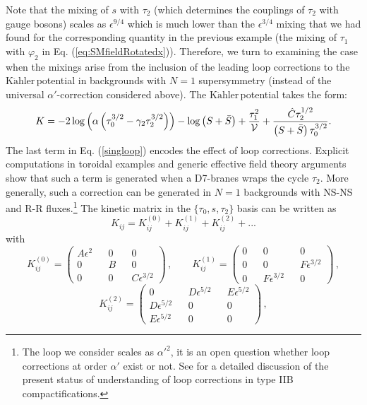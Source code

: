 \documentclass[11pt,a4paper]{article}
\newcommand{\V}{\mathcal{V}}
\newcommand{\Kahler}{\ensuremath{\text{K}\ddot{\text{a}}\text{hler}\,}}
\def\pref#1{(\ref{#1})}
\begin{document}
Note that the mixing of $s$ with $\tau_2$ (which determines the couplings of $\tau_2$ with gauge bosons) scales as $\epsilon^{9/4}$ which is much lower than the $\epsilon^{3/4}$ mixing that we had found for the corresponding quantity in the previous example (the mixing of $\tau_1$ with $\varphi_2$ in Eq. \pref{eq:SMfieldRotatedx}). Therefore, we turn to examining the case when the mixings arise from the inclusion of the leading loop corrections to the \Kahler potential in backgrounds with $N=1$ supersymmetry (instead of the universal $\alpha'$-correction considered above). The \Kahler potential takes the form:
%
%
\begin{equation}
\label{singloop}
K = - 2 \log\left(\alpha \left(\tau_0^{3/2} - \gamma_2 \tau_2^{3/2}\right)\right)   - \log \left( S + \bar{S}\right)+ \frac{\tau_1^2}{\V} + { {\hat{C}  \tau^{1/2}_{2}}\over {\left(S + \bar{S}\right) \tau_{0}^{3/2}} }.
\end{equation}
%
The last term in Eq. \pref{singloop} encodes the effect of loop corrections. Explicit computations in toroidal examples  and generic  effective field theory arguments \cite{Berg:2005ja, Conlon:2006gv, Berg:2007wt, Cicoli:2007xp, Cicoli:2008va} show that such a term is generated when a D7-branes wraps the cycle $\tau_2$. More generally, such a correction can be generated in $N=1$ backgrounds with NS-NS and R-R fluxes.\footnote{The loop we consider scales as $\alpha'^2$, it is an open question whether loop corrections at order $\alpha'$ exist or not. See \cite{Cicoli:2018kdo} for a detailed discussion of the present status of understanding of loop corrections in type IIB compactifications.} The kinetic matrix in the $\{\tau_0, s, \tau_2\}$ basis can be written as
 $$
     K_{ij} =  K_{ij}^{(0)} +  K_{ij}^{(1)}  +  K_{ij}^{(2)}  + . . .
 $$
with
\begin{equation}
K_{ij}^{(0)} = \begin{pmatrix}
A \epsilon^2  && 0 && 0 \\
 0 && B && 0  \\
0 && 0 && C \epsilon^{3/2}
\end{pmatrix} \,, \qquad
K_{ij}^{(1)} = \begin{pmatrix}
0 && 0 && 0 \\
 0 && 0 && F \epsilon^{3/2} \\
0 && F \epsilon^{3/2} && 0
\end{pmatrix} \,,
\end{equation}
\begin{equation}
K_{ij}^{(2)} = \begin{pmatrix}
0  && D \epsilon^{5/2} && E \epsilon^{5/2} \\
 D \epsilon^{5/2} && 0 && 0 \\
E \epsilon^{5/2} && 0 && 0
\end{pmatrix} \,,
\end{equation}
\end{document}

